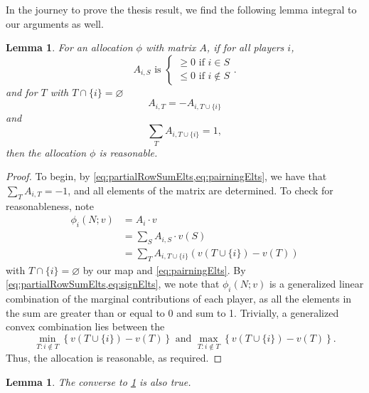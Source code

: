 \documentclass[12pt,letterpaper,final]{article}
\theoremstyle{plain}
\theoremstyle{plain}
\theoremstyle{plain}
\newtheorem{lemma}[theorem]{Lemma}
\theoremstyle{plain}
\theoremstyle{plain}
\theoremstyle{plain}
\theoremstyle{plain}
\theoremstyle{definition}
\theoremstyle{definition}
\theoremstyle{definition}
\theoremstyle{definition}
\theoremstyle{definition}
\theoremstyle{remark}
\theoremstyle{remark}
\theoremstyle{remark}
\theoremstyle{remark}
\begin{document}
In the journey to prove the thesis result, we find the following lemma
integral to our arguments as well.

\begin{lemma}\label{lem:altReasonable}
  For an allocation \(\phi\) with matrix \(A\), if for all
  players \(i\),
  \begin{equation}\label{eq:signElts}
    A_{i,S} \text{ is }
    \begin{cases}
      \geq 0 \text{ if } i\in S \\
      \leq 0 \text{ if } i\notin S
    \end{cases}.
  \end{equation}
  and for \(T\) with \(T\cap \{i\} = \varnothing\) 
  \begin{equation}\label{eq:pairningElts}
    A_{i,T} = -A_{i,T\cup\{i\}}
  \end{equation}
  and
  \begin{equation}\label{eq:partialRowSumElts}
    \sum_{T} A_{i,T\cup \{i\}}=1,
  \end{equation}
  then the allocation \(\phi\) is reasonable.
\end{lemma}

\begin{proof}
  To begin, by \cref{eq:partialRowSumElts,eq:pairningElts}, we have
  that \(\sum_{T} A_{i,T}=-1\), and all elements of the matrix are
  determined. To check for reasonableness,
  note 
  \begin{align*}
    \phi_i(N;v) & = A_i \cdot v\\
                & = \sum_S A_{i,S} \cdot v(S)\\
                & =  \sum_{T} A_{i,T\cup \{i\}}\left(v(T\cup \{i\}) - v(T)\right)
  \end{align*}
  with \(T\cap \{i\} = \varnothing\) by our map and
  \cref{eq:pairningElts}. By \cref{eq:partialRowSumElts,eq:signElts}, we note that
  \(\phi_i(N;v)\) is a generalized linear combination of the
  marginal contributions of each player, as all the elements in the
  sum are greater than or equal to 0 and sum to 1. 
  Trivially, a generalized convex
  combination lies between the
  \[
    \min_{T: i\notin T}\left\{ v\left(T \cup\{i\}\right) -v(T)\right\}
    \text{ and } \max_{T: i\notin T}\left\{ v\left(T \cup\{i\}\right)
      -v(T)\right\}.
  \]
  Thus, the allocation is reasonable, as required.
\end{proof}

\begin{lemma}
  The converse to \cref{lem:altReasonable} is also true.
\end{lemma}
\end{document}
